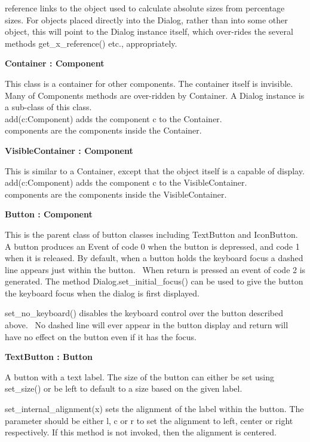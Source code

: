 reference links to the object used to calculate absolute sizes from
percentage sizes. For objects placed directly into the Dialog, rather
than into some other object, this will point to the Dialog instance
itself, which over-rides the several methods get\_x\_reference() etc.,
appropriately.

{\sffamily\bfseries
{}Container : Component}

This class is a container for other components. The container itself is
invisible. Many of Component{\textquotesingle}s methods are over-ridden
by Container. A Dialog instance is a sub-class of this
class.\\
add(c:Component) adds the component c to the Container.\\
components are the components inside the Container.

{\sffamily\bfseries
{}VisibleContainer : Component}

This is similar to a Container, except that the object itself is a
capable of display.\\
add(c:Component) adds the component c to the VisibleContainer.\\
components are the components inside the VisibleContainer.

{\sffamily\bfseries
{}Button : Component}

This is the parent class of button classes including TextButton and
IconButton. A button produces an Event of code 0 when the button is
depressed, and code 1 when it is released. By default, when a button
holds the keyboard focus a dashed line appears just
within the button. \ When return is pressed an event of code 2 is
generated. The method Dialog.set\_initial\_focus() can be used to give
the button the keyboard focus when the dialog is first displayed.

set\_no\_keyboard() disables the keyboard control over the button
described above. \ No dashed line will ever appear in the button
display and return will have no effect on the button even if it has the
focus.

{\sffamily\bfseries
{}TextButton : Button}

A button with a text label. The size of the button can either be set
using set\_size() or be left to default to a size based on the given
label.

set\_internal\_alignment(x) sets the alignment of the label within the
button. The parameter should be either {\textquotedbl}l{\textquotedbl},
{\textquotedbl}c{\textquotedbl} or {\textquotedbl}r{\textquotedbl} to
set the alignment to left, center or right respectively. If this method
is not invoked, then the alignment is centered.

